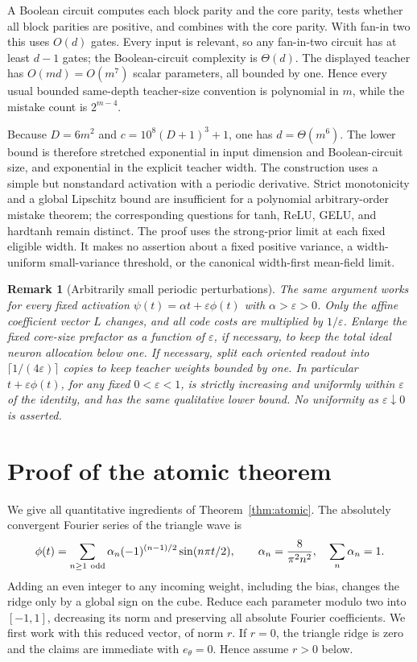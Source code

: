 \documentclass[11pt]{article}
\newtheorem{remark}[theorem]{Remark}
\newcommand{\eps}{\varepsilon}
\begin{document}
A Boolean circuit computes each block parity and the core parity,
tests whether all block parities are positive, and combines with the
core parity. With fan-in two this uses $O(d)$ gates. Every input is
relevant, so any fan-in-two circuit has at least $d-1$ gates; the
Boolean-circuit complexity is $\Theta(d)$. The displayed teacher has
$O(md)=O(m^7)$ scalar parameters, all bounded by one. Hence every
usual bounded same-depth teacher-size convention is polynomial in
$m$, while the mistake count is $2^{m-4}$.

Because $D=6m^2$ and $c=10^8(D+1)^3+1$, one has $d=\Theta(m^6)$.
The lower bound is therefore stretched exponential in input dimension
and Boolean-circuit size, and exponential in the explicit teacher
width. The construction uses a simple but nonstandard activation with a
periodic derivative. Strict monotonicity and a global Lipschitz bound
are insufficient for a polynomial arbitrary-order mistake theorem;
the corresponding questions for tanh, ReLU, GELU, and hardtanh remain
distinct. The proof uses the strong-prior
limit at each fixed eligible width. It makes no assertion about a
fixed positive variance, a width-uniform small-variance threshold,
or the canonical width-first mean-field limit.

\begin{remark}[Arbitrarily small periodic perturbations]
The same argument works for every fixed activation
$\psi(t)=\alpha t+\eps\phi(t)$ with $\alpha>\eps>0$.
Only the affine coefficient vector $L$ changes, and all code costs
are multiplied by $1/\eps$. Enlarge the fixed core-size prefactor as
a function of $\eps$, if necessary, to keep the total ideal neuron
allocation below one. If necessary, split each oriented
readout into $\lceil1/(4\eps)\rceil$ copies to keep teacher weights
bounded by one. In particular $t+\eps\phi(t)$, for any fixed
$0<\eps<1$, is strictly increasing and uniformly within $\eps$ of
the identity, and has the same qualitative lower bound. No uniformity
as $\eps\downarrow0$ is asserted.
\end{remark}

\appendix
\section{Proof of the atomic theorem}\label{app:atomic}

We give all quantitative ingredients of Theorem~\ref{thm:atomic}.
The absolutely convergent Fourier series of the triangle wave is
\begin{equation}\label{eq:triangleseries}
 \phi(t)=\sum_{n\ge1\ {\rm odd}}\alpha_n
      (-1)^{(n-1)/2}\sin(n\pi t/2),
 \qquad \alpha_n=\frac8{\pi^2n^2},\quad\sum_n\alpha_n=1.
\end{equation}
Adding an even integer to any incoming weight, including the bias,
changes the ridge only by a global sign on the cube. Reduce each
parameter modulo two into $[-1,1]$, decreasing its norm and preserving
all absolute Fourier coefficients. We first work with this reduced
vector, of norm $r$. If $r=0$, the triangle ridge is zero and the
claims are immediate with $e_\theta=0$. Hence assume $r>0$ below.
\end{document}
